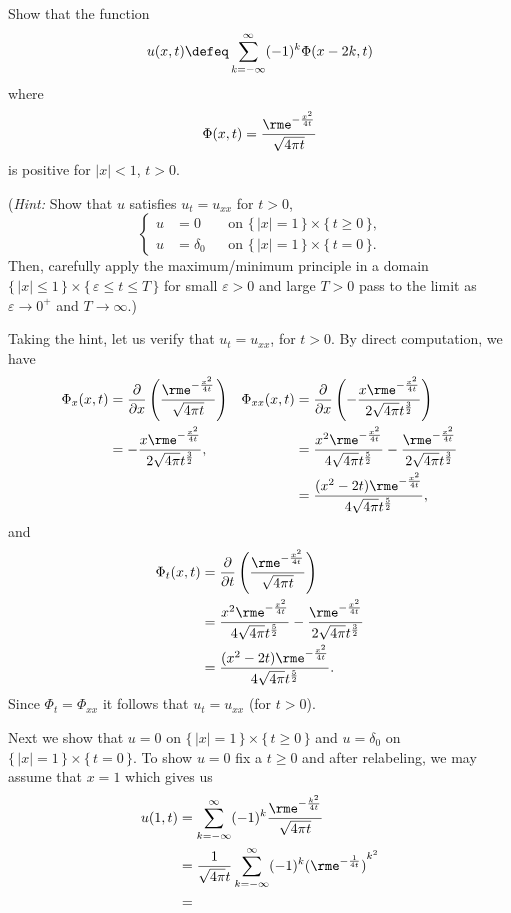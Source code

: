 \begin{problem}
  Show that the function
  \[
    u(x,t)\defeq\sum_{k=-\infty}^\infty (-1)^k\Phi(x-2k,t)
  \]
  where
  \[
    \Phi(x,t)=\frac{\rme^{-\frac{x^2}{4t}}}{\sqrt{4\pi t}}
  \]
  is positive for \(|x|<1\), \(t>0\).

  \noindent (\emph{Hint:} Show that \(u\) satisfies \(u_t=u_{xx}\) for
  \(t>0\),
  \[
    \left\{
      \begin{aligned}
        u&=0&&\text{on \(\{\,|x|=1\,\}\times\{\,t\geq 0\,\}\),}\\
        u&=\delta_0&&\text{on \(\{\,|x|=1\,\}\times\{\,t=0\,\}\).}
      \end{aligned}
    \right.
  \]
  Then, carefully apply the maximum/minimum principle in a domain
  \(\{\,|x|\leq 1\,\}\times\{\,\varepsilon\leq t\leq T\,\}\) for small
  \(\varepsilon>0\) and large \(T>0\) pass to the limit as \(\varepsilon\to
  0^+\) and \(T\to\infty\).)
\end{problem}
\begin{solution}
  Taking the hint, let us verify that \(u_t=u_{xx}\), for \(t>0\). By
  direct computation, we have
  \begin{align*}
    \Phi_x(x,t)
    &=\frac{\partial}{\partial x}
      \left(\frac{\rme^{-\frac{x^2}{4t}}}{\sqrt{4\pi t}}\right)
    &\Phi_{xx}(x,t)
    &=\frac{\partial}{\partial x}
      \left(-\frac{x\rme^{-\frac{x^2}{4t}}}{2\sqrt{4\pi}t^{\frac{3}{2}}}\right)\\
    &=-\frac{x\rme^{-\frac{x^2}{4t}}}{2\sqrt{4\pi}t^{\frac{3}{2}}},
    &&=\frac{x^2\rme^{-\frac{x^2}{4t}}}{4\sqrt{4\pi}t^{\frac{5}{2}}}
      -\frac{\rme^{-\frac{x^2}{4t}}}{2\sqrt{4\pi}t^{\frac{3}{2}}}
    \\
    &&&=\frac{(x^2-2t)\rme^{-\frac{x^2}{4t}}}{4\sqrt{4\pi}t^{\frac{5}{2}}},
  \end{align*}
  and
  \begin{align*}
    \Phi_t(x,t)
    &=\frac{\partial}{\partial t}
      \left(\frac{\rme^{-\frac{x^2}{4t}}}{\sqrt{4\pi t}}\right)\\
    &=\frac{x^2\rme^{-\frac{x^2}{4t}}}{4\sqrt{4\pi}t^{\frac{5}{2}}}
      -\frac{\rme^{-\frac{x^2}{4t}}}{2\sqrt{4\pi}t^{\frac{3}{2}}}\\
    &=\frac{(x^2-2t)\rme^{-\frac{x^2}{4t}}}{4\sqrt{4\pi}t^{\frac{5}{2}}}.
  \end{align*}
  Since \(\Phi_t=\Phi_{xx}\) it follows that \(u_t=u_{xx}\) (for \(t>0\)).

  Next we show that \(u=0\) on \(\{\,|x|=1\,\}\times\{\,t\geq 0\,\}\) and
  \(u=\delta_0\) on \(\{\,|x|=1\,\}\times\{\,t=0\,\}\). To show \(u=0\) fix
  a \(t\geq 0\) and after relabeling, we may assume that \(x=1\) which
  gives us
  \begin{align*}
    u(1,t)
    &=\sum_{k=-\infty}^\infty(-1)^k\frac{\rme^{-\frac{k^2}{4t}}}{\sqrt{4\pi
      t}}\\
    &=\frac{1}{\sqrt{4\pi }t}\sum_{k=-\infty}^\infty
      (-1)^k{(\rme^{-\frac{1}{4t}})}^{k^2}\\
    &=
  \end{align*}
\end{solution}
\newpage

